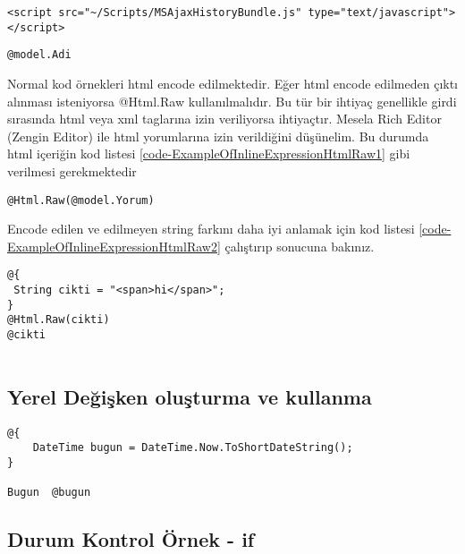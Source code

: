 \documentclass[10pt,a4paper]{article}
\begin{document}
\begin{lstlisting}[label=code-ExampleOfInlineExpression2,caption=html içinde kod örneği 2]
<script src="~/Scripts/MSAjaxHistoryBundle.js" type="text/javascript"></script>
\end{lstlisting}


\begin{lstlisting}[label=code-ExampleOfInlineExpression3,caption=html içinde kod örneği 3]
@model.Adi
\end{lstlisting}

Normal kod örnekleri html encode edilmektedir.
Eğer html encode edilmeden çıktı alınması isteniyorsa @Html.Raw kullanılmalıdır.
Bu tür bir ihtiyaç genellikle girdi sırasında html veya xml taglarına izin veriliyorsa ihtiyaçtır.
Mesela Rich Editor (Zengin Editor) ile html yorumlarına izin verildiğini düşünelim.
Bu durumda html içeriğin kod listesi \ref{code-ExampleOfInlineExpressionHtmlRaw1}
gibi verilmesi gerekmektedir

\begin{lstlisting}[label=code-ExampleOfInlineExpressionHtmlRaw1,caption=html içinde kod örneği 1 html encode yapılmadan]
@Html.Raw(@model.Yorum)
\end{lstlisting}

Encode edilen ve edilmeyen string farkını daha iyi anlamak  için kod listesi \ref{code-ExampleOfInlineExpressionHtmlRaw2} çalıştırıp sonucuna bakınız.

\begin{lstlisting}[label=code-ExampleOfInlineExpressionHtmlRaw2,caption=html içinde kod örneği 2 html encode yapılmadan ]
@{
 String cikti = "<span>hi</span>";
}
@Html.Raw(cikti)
@cikti


\end{lstlisting}


\subsection{Yerel Değişken oluşturma ve kullanma}


\begin{lstlisting}[label=code-LocalVariableUse,caption=Yerel Değişken oluşturma ve kullanma]
@{
	DateTime bugun = DateTime.Now.ToShortDateString();
}

Bugun  @bugun

\end{lstlisting}


\subsection{Durum Kontrol Örnek - if}
\end{document}
